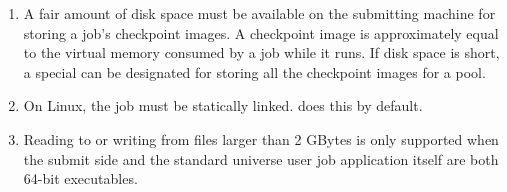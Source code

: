 \begin{enumerate}
\item A fair amount of disk space must be available on the submitting machine
for storing a job's checkpoint images.  A checkpoint image is approximately
equal to the virtual memory consumed by a job while it runs.  If disk space
is short, a special  can be designated for storing
all the checkpoint images for a pool.

\item On Linux, the job must be statically linked. 
 does this by default.

\item Reading to or writing from files larger than 2 GBytes is only supported
when the submit side  and the standard universe user job
application itself are both 64-bit executables.

\end{enumerate}



